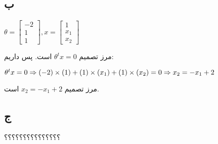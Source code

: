 \documentclass{article}
\begin{document}
\subsection{ب}
\begin{latin}
$
\theta =
\begin{bmatrix}
-2 \\
1 \\
1
\end{bmatrix},
x = 
\begin{bmatrix}
1 \\
x_1 \\
x_2
\end{bmatrix}
$
\end{latin}
مرز تصمیم $\theta ^ t x = 0$ است. پس داریم:
\begin{latin}
$
\theta ^ t x = 0 \\ \Rightarrow 
\left( -2 \right) \times \left( 1 \right) + \left( 1 \right) \times \left( x_1 \right) + \left( 1 \right) \times \left( x_2 \right) = 0 \\ \Rightarrow 
x_2 = -x_1 + 2
$
\end{latin}
مرز تصمیم $x_2 = -x_1 + 2$ است.
\subsection{ج}
؟؟؟؟؟؟؟؟؟؟؟؟؟؟؟



\section{}
\end{document}

